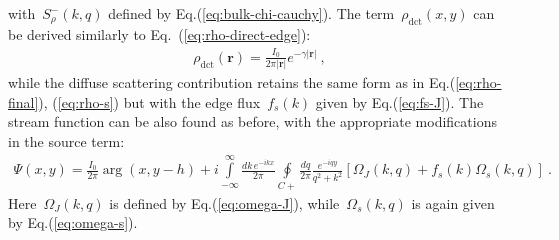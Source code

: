 \documentclass[preprint,aps,eqsecnum, prb]{revtex4-1}
\newcommand{\fminus}[1]{{#1}^{-}}
\newcommand{\dct}[1]{{#1}_\mathrm{dct}}
\begin{document}
with~$\fminus{S}_\rho(k, q)$ defined by Eq.(\ref{eq:bulk-chi-cauchy}).
The term~$\dct{\rho}(x, y)$ can be derived similarly to Eq.~(\ref{eq:rho-direct-edge}):
\begin{align}
\dct{\rho}({\bm r}) = \frac{I_0}{2\pi |{\bm r}|} e^{-\gamma |{\bm r}|}\ , 
\end{align}
while the diffuse scattering contribution retains the same form as in 
Eq.(\ref{eq:rho-final}), (\ref{eq:rho-s}) but with the edge flux~$f_s(k)$
given by Eq.(\ref{eq:fs-J}).
The stream function can be also found as before, with the 
appropriate modifications in the source term:
\begin{align}
\Psi(x, y) = \frac{I_0}{2\pi} \arg (x, y - h)
  + i\int\limits_{-\infty}^{\infty} \frac{dk\, e^{-ikx}}{2\pi}
  \oint\limits_{C+} \frac{dq}{2\pi} \frac{e^{-iqy}}{q^2 + k^2}
  \left[\Omega_{J}(k, q)
  + f_s(k) \Omega_{s}(k, q) \right]\ . 
\end{align}
Here~$\Omega_{J}(k, q)$ is defined by Eq.(\ref{eq:omega-J}), 
while~$\Omega_s(k, q)$ is again given by Eq.(\ref{eq:omega-s}).
\end{document}
